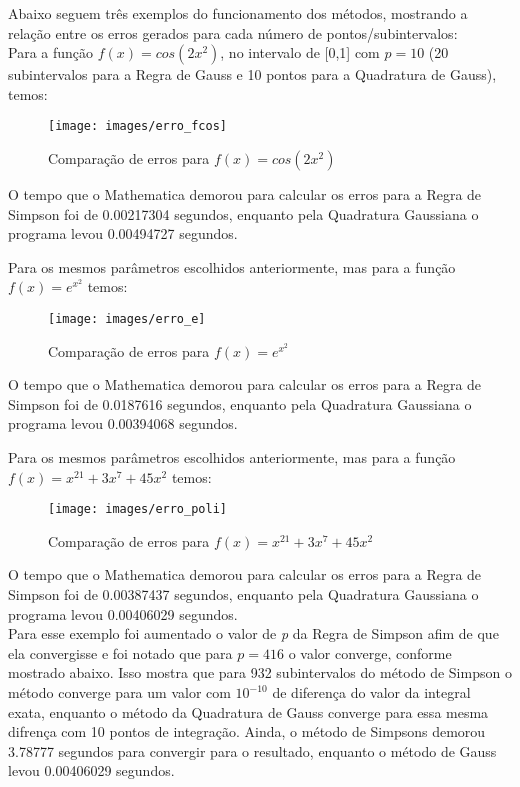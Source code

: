 \documentclass[12pt,a4paper]{article}
\begin{document}
\quad Abaixo seguem três exemplos do funcionamento dos métodos, mostrando a relação entre os erros gerados para cada número de pontos/subintervalos:\\

\quad Para a função $f(x)=cos(2x^2)$, no intervalo de [0,1] com $p=10$ (20 subintervalos para a Regra de Gauss e 10 pontos para a Quadratura de Gauss), temos:

\begin{figure}[h]
\texttt{[image: images/erro\_fcos]}
\caption{Comparação de erros para $f(x)=cos(2x^2)$}
\end{figure}

\qquad O tempo que o Mathematica demorou para calcular os erros para a Regra de Simpson foi de 0.00217304 segundos, enquanto pela Quadratura Gaussiana o programa levou 0.00494727 segundos.


\newpage
\qquad Para os mesmos parâmetros escolhidos anteriormente, mas para a função $f(x)=e^{x^{2}}$ temos:


\begin{figure}[h]
\texttt{[image: images/erro\_e]}
\caption{Comparação de erros para $f(x)=e^{x^{2}}$}
\end{figure}

\qquad O tempo que o Mathematica demorou para calcular os erros para a Regra de Simpson foi de 0.0187616 segundos, enquanto pela Quadratura Gaussiana o programa levou 0.00394068 segundos.

\newpage
\qquad Para os mesmos parâmetros escolhidos anteriormente, mas para a função $f(x)=x^{21} + 3 x^7 + 45 x^2$ temos:

\begin{figure}[h]
\texttt{[image: images/erro\_poli]}
\caption{Comparação de erros para $f(x)=x^{21}+3x^7+45x^2$}
\end{figure}

\qquad O tempo que o Mathematica demorou para calcular os erros para a Regra de Simpson foi de 0.00387437 segundos, enquanto pela Quadratura Gaussiana o programa levou 0.00406029 segundos.\\

\newpage
\qquad Para esse exemplo foi aumentado o valor de \textit{p} da Regra de Simpson afim de que ela convergisse e foi notado que para $p=416$ o valor converge, conforme mostrado abaixo. Isso mostra que para 932 subintervalos do método de Simpson o método converge para um valor com $10^{-10}$ de diferença do valor da integral exata, enquanto o método da Quadratura de Gauss converge para essa mesma difrença com 10 pontos de integração. Ainda, o método de Simpsons demorou 3.78777 segundos para convergir para o resultado, enquanto o método de Gauss levou 0.00406029 segundos.
\end{document}
